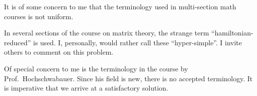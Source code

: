 \documentclass{sample}
\begin{document}
It is of some concern to me   that 
the terminology used in  multi-section
 math courses is not uniform.

In several sections of the course on 
matrix theory, the strange term   
 ``hamiltonian-reduced'' is used. 
  I, personally, would rather call these 
 ``hyper-simple''. I
invite others to comment on this  problem.

Of special concern to me is the terminology in the course 
by Prof.~Hochschwabauer.
Since his field is new, there is no accepted
terminology.   It is imperative 
that we arrive at a satisfactory solution.
\end{document}
